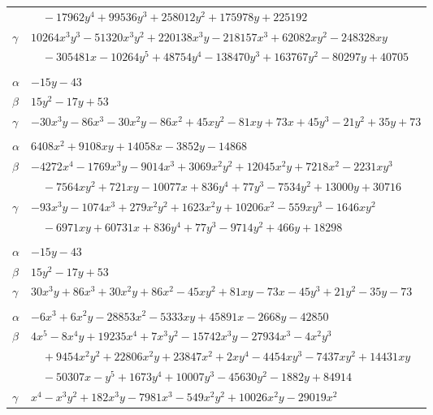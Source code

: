 \documentclass[11pt]{article}
\begin{document}
\begin{longtable}{@{}ll@{}}
 & $\quad -17962y^{4}+99536y^{3}+258012y^{2}+175978y+225192$\\
$\gamma$ & $10264x^{3}y^{3}-51320x^{3}y^{2}+220138x^{3}y-218157x^{3}+62082xy^{2}-248328xy$\\
 & $\quad -305481x-10264y^{5}+48754y^{4}-138470y^{3}+163767y^{2}-80297y+40705$\\
\addlinespace[3pt]
\multicolumn{2}{@{}l}{$\{i,j\}=\{8,17\}$, $k_{ij}=13^{2}$}\\
$\alpha$ & $-15y-43$\\
$\beta$ & $15y^{2}-17y+53$\\
$\gamma$ & $-30x^{3}y-86x^{3}-30x^{2}y-86x^{2}+45xy^{2}-81xy+73x+45y^{3}-21y^{2}+35y+73$\\
\addlinespace[3pt]
\multicolumn{2}{@{}l}{$\{i,j\}=\{8,25\}$, $k_{ij}=2\cdot 3^{3}\cdot 7\cdot 13^{2}$}\\
$\alpha$ & $6408x^{2}+9108xy+14058x-3852y-14868$\\
$\beta$ & $-4272x^{4}-1769x^{3}y-9014x^{3}+3069x^{2}y^{2}+12045x^{2}y+7218x^{2}-2231xy^{3}$\\
 & $\quad -7564xy^{2}+721xy-10077x+836y^{4}+77y^{3}-7534y^{2}+13000y+30716$\\
$\gamma$ & $-93x^{3}y-1074x^{3}+279x^{2}y^{2}+1623x^{2}y+10206x^{2}-559xy^{3}-1646xy^{2}$\\
 & $\quad -6971xy+60731x+836y^{4}+77y^{3}-9714y^{2}+466y+18298$\\
\addlinespace[3pt]
\multicolumn{2}{@{}l}{$\{i,j\}=\{8,26\}$, $k_{ij}=13^{2}$}\\
$\alpha$ & $-15y-43$\\
$\beta$ & $15y^{2}-17y+53$\\
$\gamma$ & $30x^{3}y+86x^{3}+30x^{2}y+86x^{2}-45xy^{2}+81xy-73x-45y^{3}+21y^{2}-35y-73$\\
\addlinespace[3pt]
\multicolumn{2}{@{}l}{$\{i,j\}=\{8,28\}$, $k_{ij}=2^{2}\cdot 3^{3}\cdot 7\cdot 13^{2}$}\\
$\alpha$ & $-6x^{3}+6x^{2}y-28853x^{2}-5333xy+45891x-2668y-42850$\\
$\beta$ & $4x^{5}-8x^{4}y+19235x^{4}+7x^{3}y^{2}-15742x^{3}y-27934x^{3}-4x^{2}y^{3}$\\
 & $\quad +9454x^{2}y^{2}+22806x^{2}y+23847x^{2}+2xy^{4}-4454xy^{3}-7437xy^{2}+14431xy$\\
 & $\quad -50307x-y^{5}+1673y^{4}+10007y^{3}-45630y^{2}-1882y+84914$\\
$\gamma$ & $x^{4}-x^{3}y^{2}+182x^{3}y-7981x^{3}-549x^{2}y^{2}+10026x^{2}y-29019x^{2}$\\

\end{longtable}
\end{document}
